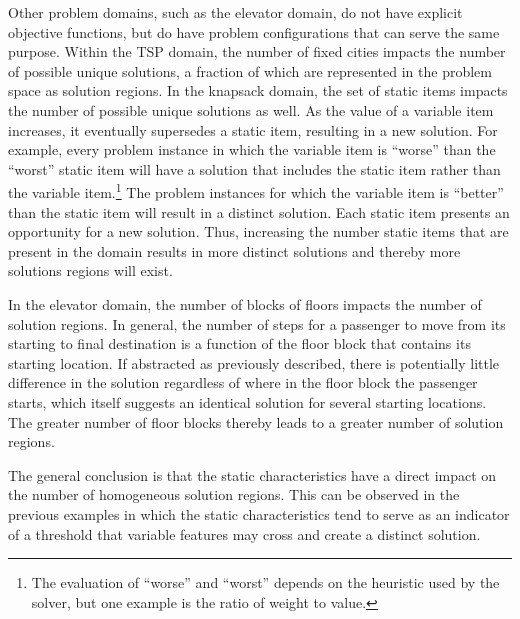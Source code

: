 Other problem domains, such as the elevator domain, do not have explicit objective functions, but do have problem configurations that can serve the same purpose.  Within the TSP domain, the number of fixed cities impacts the number of possible unique solutions, a fraction of which are represented in the problem space as solution regions.  In the knapsack domain, the set of static items impacts the number of possible unique solutions as well.  As the value of a variable item increases, it eventually supersedes a  static item, resulting in a new solution.  For example, every problem instance in which the variable item is ``worse'' than the ``worst'' static item will have a solution that includes the static item rather than the variable item.\footnote{The evaluation of ``worse'' and ``worst'' depends on the heuristic used by the solver, but one example is the ratio of weight to value.}  The problem instances for which the variable item is ``better'' than the static item will result in a distinct solution.  Each static item presents an opportunity for a new solution. Thus, increasing the number static items that are present in the domain results in  more distinct solutions and thereby more solutions regions will exist.  

In the elevator domain, the number of blocks of floors impacts the number of solution regions.  In general, the number of steps for a passenger to move from its starting to final destination is a function of the floor block that contains its starting location.  If abstracted as previously described, there is potentially little difference in the solution regardless of where in the floor block the passenger starts, which itself suggests an identical solution for several starting locations.  The greater number of floor blocks thereby leads to a greater number of solution regions.

The general conclusion is that the static characteristics have a direct impact on the number of homogeneous solution regions.  This can be observed in the previous examples in which the static characteristics tend to serve as an indicator of a threshold that variable features may cross and create a distinct solution.


